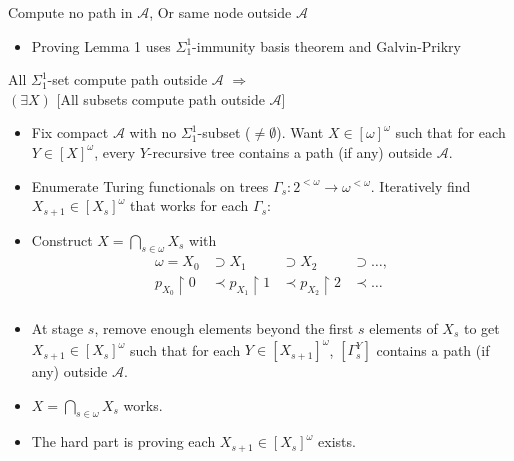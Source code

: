 \begin{frame}{Compute no path in $\mathcal{A}$, Or same node outside
$\mathcal{A}$}
  \begin{itemize}
    \item Proving Lemma 1 uses $\Sigma_1^1$-immunity basis theorem and
      Galvin-Prikry
  \end{itemize}
\end{frame}

\begin{frame}{All $\Sigma_1^1$-set compute path outside $\mathcal{A}$
$\Rightarrow$\\ $(\exists X)$ {[All subsets compute path outside
$\mathcal{A}$]}}
  \begin{itemize}
    \item Fix compact $\mathcal{A}$ with no $\Sigma_1^1$-subset
      ($\neq\emptyset$). Want $X\in[\omega]^\omega$ such that for each
      $Y\in[X]^\omega$, every $Y$-recursive tree contains a path (if any)
      outside $\mathcal{A}$.
    \item Enumerate Turing functionals on trees
      $\Gamma_s:2^{<\omega} \rightarrow \omega^{<\omega}$. Iteratively
      find $X_{s+1}\in[X_s]^\omega$ that works for each $\Gamma_s$:
    \item Construct $X=\bigcap_{s\in\omega}X_s$ with
      \[\begin{array}{rlll}
        \omega=X_0 &\supset X_1 &\supset X_2 &\supset\ldots,\\
        p_{X_0}\restriction0 &\prec p_{X_1}\restriction1 &\prec
          p_{X_2}\restriction2 &\prec\ldots\\
      \end{array}\]
    \item At stage $s$, remove enough elements beyond the first $s$
      elements of $X_s$ to get $X_{s+1}\in[X_s]^\omega$ such that for each
      $Y\in[X_{s+1}]^\omega$, $[\Gamma_s^Y]$
      contains a path (if any) outside $\mathcal{A}$.
    \item $X=\bigcap_{s\in\omega}X_s$ works.
    \item The hard part is proving each $X_{s+1}\in[X_s]^\omega$ exists.
  \end{itemize}
\end{frame}

